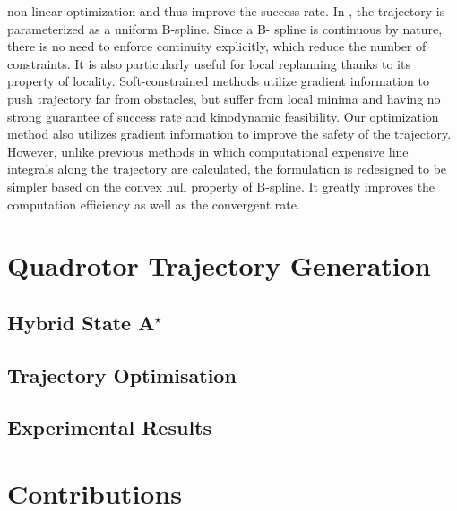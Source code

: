 non-linear optimization and thus improve the success rate. In \cite{usenko2017real}, the trajectory is parameterized as a uniform B-spline.
Since a B- spline is continuous by nature, there is no need to enforce
continuity explicitly, which reduce the number of constraints.
It is also particularly useful for local replanning thanks to its property of locality.
Soft-constrained methods utilize gradient information to push trajectory far from obstacles,
but suffer from local minima and having no strong guarantee of success rate and kinodynamic feasibility.
Our optimization method also utilizes gradient information to improve the safety of the trajectory.
However, unlike previous methods in which computational expensive line integrals along the trajectory are calculated,
the formulation is redesigned to be simpler based on the convex hull property of B-spline.
It greatly improves the computation efficiency as well as the convergent rate.

\section{Quadrotor Trajectory Generation}

\subsection{Hybrid State A$^{\star}$}
\subsection{Trajectory Optimisation}
\subsection{Experimental Results}

\section{Contributions}

